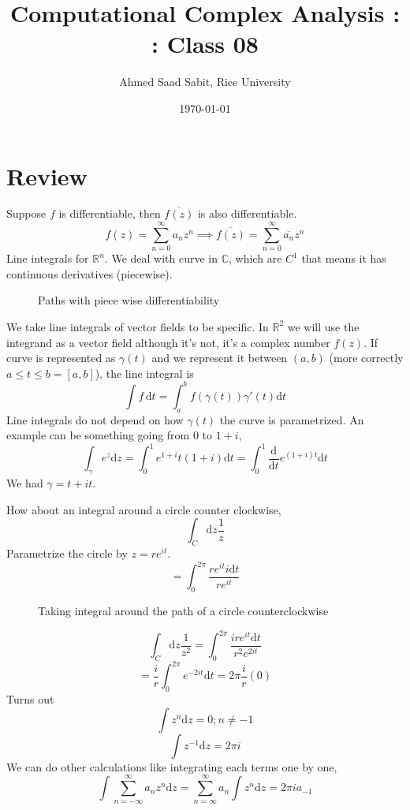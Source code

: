 \documentclass[letter]{article}
\title{Computational Complex Analysis : : Class 08}
\author{Ahmed Saad Sabit, Rice University}
\date{\today}
\begin{document}
\maketitle 

\section{Review} 
Suppose $f$ is differentiable, then $\overline{f(z)}$ is also differentiable. 
\[
f(z) = \sum_{n=0}^{\infty} a_n z^n \implies \overline{f(z)} = \sum_{n=0}^{\infty} \overline{a_n} z^n
\] 
Line integrals for $\mathbb{R}^{n}$. We deal with curve in $\mathbb{C}$, which are $C^{1}$ that means it has continuous derivatives (piecewise). 
\begin{figure}[ht]
    \centering
    \caption{Paths with piece wise differentiability}
    \label{fig:paths-with-piece-wise-differentiability}
\end{figure}
We take line integrals of vector fields to be specific. In $\mathbb{R}^{2}$ we will use the integrand as a vector field although it's not, it's a complex number $f(z)$. If curve is represented as $\gamma(t)$ and we represent it between $(a,b)$ (more correctly $a\le t\le b = [a,b]$), the line integral is
\[
\int f \,\mathrm{d} t = \int_a^b f(\gamma(t)) \gamma'(t) \mathrm{d} t
\]
Line integrals do not depend on how $\gamma(t)$ the curve is parametrized.
An example can be something going from $0$ to $1+i$, 
\[
	\int_\gamma e^{z}\mathrm{d} z = \int_0^{1} e^{1+i}t (1+i)\mathrm{d} t = \int_0^{1} \frac{\mathrm{d} }{\mathrm{d} t} e^{(1+i)t} \mathrm{d} t
\] We had $\gamma = t + it$. 

How about an integral around a circle counter clockwise, 
\[
\int_C \mathrm{d} z \frac{1}{z}
\] 
Parametrize the circle by $z = re^{it}$. 
\[
= \int_0^{2\pi } \frac{re^{it}i\mathrm{d} t}{re^{it}}
\] 
\begin{figure}[ht]
    \centering
    \caption{Taking integral around the path of a circle counterclockwise}
    \label{fig:taking-integral-around-the-path-of-a-circle-counterclockwise}
\end{figure}
\[
\int_C \mathrm{d} z \frac{1}{z^2} = 
\int_0^{2\pi } \frac{i r e^{it} \mathrm{d} t}{r^2 e^{2it}} 
\] 
\[
 = \frac{i}{r} \int_0^{2 \pi } e^{-2it} \mathrm{d} t = 2\pi \frac{i}{r} \left( 0\right)
\] 
Turns out 
\[
\int z^{n} \mathrm{d} z = 0 ; n\neq -1
\] 
\[
\int z^{-1} \mathrm{d} z = 2\pi i
\] 
We can do other calculations like integrating each terms one by one,
\[
	\int \sum_{n=-\infty}^{\infty} a_n z^n \mathrm{d} z = \sum_{n=\infty}^{\infty} a_n \int z^{n} \mathrm{d} z = 2\pi i a_{-1}
\]  
\end{document}
